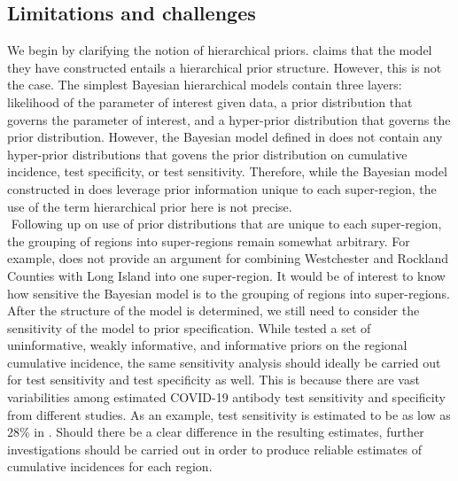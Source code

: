 \subsection{Limitations and challenges}
We begin by clarifying the notion of hierarchical priors. \cite{meyer2022adjusting} claims that the model they have constructed entails a hierarchical prior structure. However, this is not the case. The simplest Bayesian hierarchical models contain three layers: likelihood of the parameter of interest given data, a prior distribution that governs the parameter of interest, and a hyper-prior distribution that governs the prior distribution. However, the Bayesian model defined in \cite{meyer2022adjusting} does not contain any hyper-prior distributions that govens the prior distribution on cumulative incidence, test specificity, or test sensitivity. Therefore, while the Bayesian model constructed in \cite{meyer2022adjusting} does leverage prior information unique to each super-region, the use of the term hierarchical prior here is not precise.\\
\newline$ $
Following up on use of prior distributions that are unique to each super-region, the grouping of regions into super-regions remain somewhat arbitrary. For example, \cite{meyer2022adjusting} does not provide an argument for combining Westchester and Rockland Counties with Long Island into one super-region. It would be of interest to know how sensitive the Bayesian model is to the grouping of regions into super-regions. After the structure of the model is determined, we still need to consider the sensitivity of the model to prior specification. While \cite{meyer2022adjusting} tested a set of uninformative, weakly informative, and informative priors on the regional cumulative incidence, the same sensitivity analysis should ideally be carried out for test sensitivity and test specificity as well. This is because there are vast variabilities among estimated COVID-19 antibody test sensitivity and specificity from different studies. As an example, test sensitivity is estimated to be as low as $28$\% in \cite{noordin2022sero}. Should there be a clear difference in the resulting estimates, further investigations should be carried out in order to produce reliable estimates of cumulative incidences for each region.\\
\newline$ $
